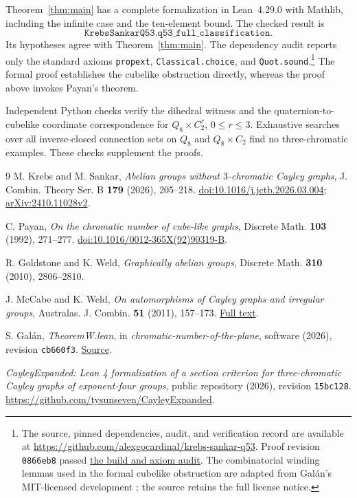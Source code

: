 \documentclass[11pt]{article}
\begin{document}
Theorem~\ref{thm:main} has a complete formalization in Lean~4.29.0 with
Mathlib, including the infinite case and the ten-element bound.
The checked result is
\[
 \texttt{KrebsSankarQ53.q53\_full\_classification}.
\]
Its hypotheses agree with Theorem~\ref{thm:main}.
The dependency audit reports only the standard axioms
\texttt{propext}, \texttt{Classical.choice}, and
\texttt{Quot.sound}.\footnote{The source, pinned dependencies, audit,
and verification record are available at
\url{https://github.com/alexgocardinal/krebs-sankar-q53}.
Proof revision \texttt{0866eb8} passed
\href{https://github.com/alexgocardinal/krebs-sankar-q53/actions/runs/39317175310}
{the build and axiom audit}.
The combinatorial winding lemmas used in the formal cubelike obstruction
are adapted from Gal\'an's MIT-licensed development \cite{Galan};
the source retains the full license notice.}
The formal proof establishes the cubelike obstruction directly, whereas
the proof above invokes Payan's theorem.

Independent Python checks verify the dihedral witness and the
quaternion-to-cubelike coordinate correspondence for
$Q_8\times C_2^r$, $0\leq r\leq3$. Exhaustive searches over all
inverse-closed connection sets on $Q_8$ and $Q_8\times C_2$ find no
three-chromatic examples. These checks supplement the proofs.

\begin{thebibliography}{9}
M. Krebs and M. Sankar,
\emph{Abelian groups without $3$-chromatic Cayley graphs},
J. Combin. Theory Ser. B \textbf{179} (2026), 205--218.
\href{https://doi.org/10.1016/j.jctb.2026.03.004}{doi:10.1016/j.jctb.2026.03.004};
\href{https://arxiv.org/abs/2410.11028}{arXiv:2410.11028v2}.

C. Payan, \emph{On the chromatic number of cube-like graphs},
Discrete Math. \textbf{103} (1992), 271--277.
\href{https://doi.org/10.1016/0012-365X(92)90319-B}{doi:10.1016/0012-365X(92)90319-B}.

R. Goldstone and K. Weld, \emph{Graphically abelian groups},
Discrete Math. \textbf{310} (2010), 2806--2810.

J. McCabe and K. Weld, \emph{On automorphisms of Cayley graphs and
irregular groups}, Australas. J. Combin. \textbf{51} (2011), 157--173.
\href{https://ajc.maths.uq.edu.au/pdf/51/ajc_v51_p157.pdf}{Full text}.

S. Gal\'an, \emph{TheoremW.lean}, in
\emph{chromatic-number-of-the-plane}, software (2026),
revision \texttt{cb660f3}.
\href{https://github.com/decalion89/chromatic-number-of-the-plane/blob/cb660f322dce47a773f347d39818ffc46e6ca72c/lean/TheoremW.lean}
{Source}.

\emph{CayleyExpanded: Lean 4 formalization of a section criterion
for three-chromatic Cayley graphs of exponent-four groups},
public repository (2026), revision \texttt{15bc128}.
\url{https://github.com/tysunseven/CayleyExpanded}.
\end{thebibliography}
\end{document}
